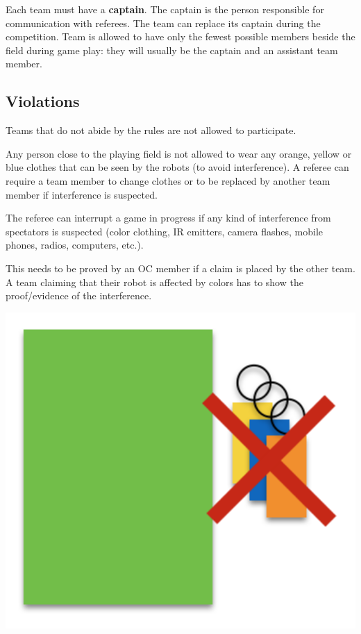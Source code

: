 \documentclass{article}
\begin{document}
Each team must have a \textbf{captain}. The captain is the person responsible for communication with referees. The team can replace its captain during the competition. Team is allowed to have only the fewest possible members beside the field during game play: they will usually be the captain and an assistant team member.

\subsection{ Violations \label{ref-017}}

Teams that do not abide by the rules are not allowed to participate.



Any person close to the playing field is not allowed to wear any orange, yellow or blue clothes that can be seen by the robots (to avoid interference). A referee can require a team member to change clothes or to be replaced by another team member if interference is suspected.

The referee can interrupt a game in progress if any kind of interference from spectators is suspected (color clothing, IR emitters, camera flashes, mobile phones, radios, computers, etc.).

This needs to be proved by an OC member if a claim is placed by the other team. A team claiming that their robot is affected by colors has to show the proof/evidence of the interference.

\includegraphics[width=1\textwidth]{media/image2.png}
\end{document}
